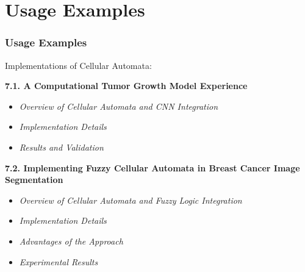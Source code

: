 \documentclass{beamer}
\begin{document}
\section{Usage Examples}
\begin{frame}
    \frametitle{Usage Examples}
    Implementations of Cellular Automata:
    
    \textbf{7.1. A Computational Tumor Growth Model Experience}
    \begin{itemize}
        \item \textit{Overview of Cellular Automata and CNN Integration}
        \item \textit{Implementation Details}
        \item \textit{Results and Validation}
    \end{itemize}
    
    \textbf{7.2. Implementing Fuzzy Cellular Automata in Breast Cancer Image Segmentation}
    \begin{itemize}
        \item \textit{Overview of Cellular Automata and Fuzzy Logic Integration}
        \item \textit{Implementation Details}
        \item \textit{Advantages of the Approach}
        \item \textit{Experimental Results}
    \end{itemize}
\end{frame}
\end{document}
